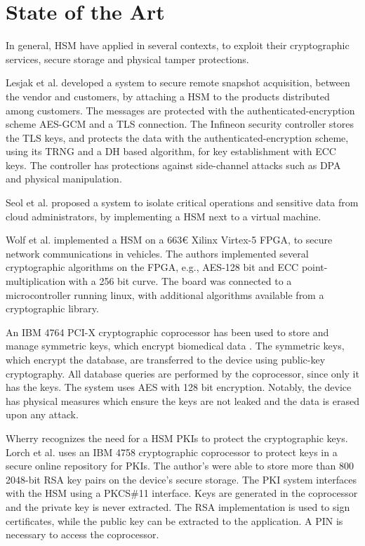 \section{State of the Art}\label{chap:background:art}

In general, \ac{HSM} have applied in several contexts, to exploit their cryptographic services, secure storage and physical tamper protections.

Lesjak et al. \cite{iothardware} developed a system to secure remote snapshot acquisition, between the vendor and customers, by attaching a HSM to the products distributed among customers. 
The messages are protected with the authenticated-encryption scheme \ac{AES}-\ac{GCM} and a TLS connection.
The Infineon security controller stores the TLS keys, and protects the data with the authenticated-encryption scheme, using its TRNG and a \ac{DH} based algorithm, for key establishment with ECC keys. The controller has protections against side-channel attacks such as \ac{DPA} and physical manipulation.

Seol et al. \cite{trustediaashsm} proposed a system to isolate critical operations and sensitive data from cloud administrators, by implementing a \ac{HSM} next to a virtual machine.

Wolf et al. \cite{wolf2011design} implemented a HSM on a 663€ Xilinx Virtex-5 FPGA, to secure network communications in vehicles. The authors implemented several cryptographic algorithms on the FPGA, e.g., AES-128 bit and ECC point-multiplication with a 256 bit curve. The board was connected to a microcontroller running linux, with additional algorithms available from a cryptographic library.

An IBM 4764 PCI-X cryptographic coprocessor has been used to store and manage symmetric keys, which encrypt biomedical data \cite{canim2011biomedical}. The symmetric keys, which encrypt the database, are transferred to the device using public-key cryptography. All database queries are performed by the coprocessor, since only it has the keys. The system uses AES with 128 bit encryption. Notably, the device has physical measures which ensure the keys are not leaked and the data is erased upon any attack.

Wherry \cite{wherry2003secure} recognizes the need for a HSM PKIs to protect the cryptographic keys.
Lorch et al. \cite{lorch2004hardware} uses an IBM 4758 cryptographic coprocessor to protect keys in a secure online repository for PKIs. The author's were able to store more than 800 2048-bit RSA key pairs on the device's secure storage. The PKI system interfaces with the HSM using a PKCS\#11 interface. Keys are generated in the coprocessor and the private key is never extracted. The RSA implementation is used to sign certificates, while the public key can be extracted to the application. A PIN is necessary to access the coprocessor.

